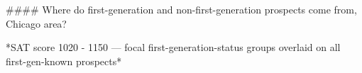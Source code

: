 #### Where do first-generation and non-first-generation prospects come from, Chicago area?

*SAT score 1020 - 1150 — focal first-generation-status groups overlaid on all first-gen-known prospects*
